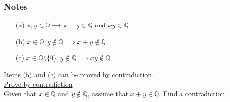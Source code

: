 \documentclass[12pt]{article}
\begin{document}
\subsubsection*{Notes}
\begin{itemize}
\item[(a)] $x, y \in \mathbb{Q} \implies x + y \in \mathbb{Q} \text{ and } xy \in \mathbb{Q}$
\item[(b)] $x \in \mathbb{Q}, y \notin \mathbb{Q} \implies x + y \notin \mathbb{Q}$
\item[(c)] $x \in \mathbb{Q} \setminus \{0\}, y \notin \mathbb{Q} \implies xy \notin \mathbb{Q}$
\end{itemize}
Items (b) and (c) can be proved by contradiction.\\
\underline{Prove by contradiction}\\
Given that $x \in \mathbb{Q}$ and $y \notin \mathbb{Q}$, assume that $x + y \in \mathbb{Q}$. Find a contradiction.
\end{document}
